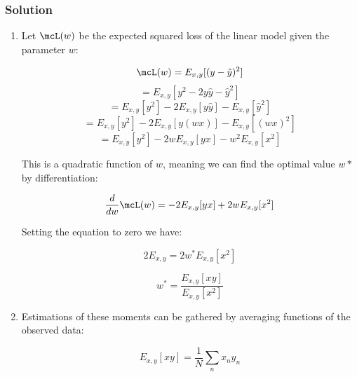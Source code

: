 \documentclass[submit]{harvardml}
\begin{document}
\newpage
\subsubsection*{Solution}

\begin{enumerate}

\item Let $\mcL(w)$ be the expected squared loss of the linear model given
the parameter $w$:

\begin{equation*}
    \mcL(w) = E_{x,y}[(y-\hat{y})^2]
\end{equation*}
\begin{equation*}
    = E_{x,y}[y^2 - 2y\hat{y} -\hat{y}^2]
\end{equation*}
\begin{equation*}
    = E_{x,y}[y^2] - 2E_{x,y}[y\hat{y}] - E_{x,y}[\hat{y}^2]
\end{equation*}
\begin{equation*}
    = E_{x,y}[y^2] - 2E_{x,y}[y(wx)] - E_{x,y}[(wx)^2]
\end{equation*}
\begin{equation*}
    = E_{x,y}[y^2] - 2wE_{x,y}[yx] - w^2E_{x,y}[x^2]
\end{equation*}

This is a quadratic function of $w$, meaning we can find the optimal value $w*$
by differentiation:

\begin{equation*}
    \frac{d}{dw} \mcL(w) = -2E_{x,y}[yx] + 2wE_{x,y}[x^2]
\end{equation*}

Setting the equation to zero we have:

\begin{equation*}
    2E_{x,y} = 2w^*E_{x,y}[x^2]
\end{equation*}

\begin{equation*}
    w^* = \frac{E_{x,y}[xy]}{E_{x,y}[x^2]}
\end{equation*}

\item

Estimations of these moments can be gathered by averaging functions of
the observed data:

\begin{equation*}
    E_{x,y}[xy] = \frac{1}{N} \sum_n x_n y_n
\end{equation*}


\end{enumerate}
\end{document}
